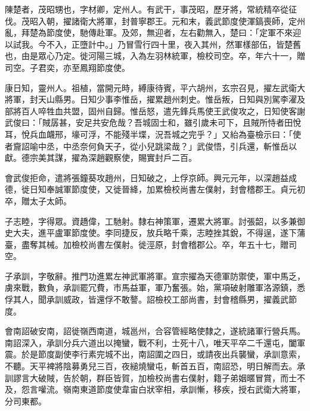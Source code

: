 \begin{pinyinscope}
 陳楚者，茂昭甥也，字材卿，定州人。有武干，事茂昭，歷牙將，常統精卒從征伐。茂昭入朝，擢諸衛大將軍，封普寧郡王。元和末，義武節度使渾鎬喪師，定州亂，拜楚為節度使，馳傳赴軍。及郊，無迎者，左右勸無入，楚曰：「定軍不來迎以試我。今不入，正墮計中。」乃冒雪行四十里，夜入其州，然軍樣部伍，皆楚舊也，由是眾心乃定。徙河陽三城，入為左羽林統軍，檢校司空。卒，年六十一，贈司空。子君奕，亦至鳳翔節度使。



 康日知，靈州人。祖植，當開元時，縛康待賓，平六胡州，玄宗召見，擢左武衛大將軍，封天山縣男。日知少事李惟岳，擢累趙州刺史。惟岳叛，日知與別駕李濯及部將百人啐牲血共盟，固州自歸。惟岳怒，遣先鋒兵馬使王武俊攻之，日知使客謝武俊曰：「賊孱甚，安足共安危哉？吾城固士和，雖引歲未可下，且賊所恃者田悅耳，悅兵血衊邢，壕可浮，不能殘半堞，況吾城之完乎？」又紿為臺檢示曰：「使者齎詔喻中丞，中丞奈何負天子，從小兒跳梁哉？」武俊悟，引兵還，斬惟岳以獻。德宗美其謀，擢為深趙觀察使，賜實封戶二百。



 會武俊拒命，遣將張鐘葵攻趙州，日知破之，上俘京師。興元元年，以深趙益成德，徙日知奉誠軍節度使，又徙晉絳，加累檢校尚書左僕射，封會稽郡王。貞元初卒，贈太子太師。



 子志睦，字得眾。資趫偉，工馳射。隸右神策軍，遷累大將軍。討張韶，以多兼御史大夫，進平盧軍節度使。李同捷反，放兵略千乘，志睦挫其銳，不得逞，遂下蒲臺，盡奪其械。加檢校尚書左僕射。徙涇原，封會稽郡公。卒，年五十七，贈司空。



 子承訓，字敬辭。推門功進累左神武軍將軍。宣宗擢為天德軍防禦使，軍中馬乏，虜來戰，數負，承訓罷冗費，市馬益軍，軍乃奮張。始，黨項破射雕軍洛源鎮，悉俘其人，聞承訓威政，皆還俘不敢謷。詔檢校工部尚書，封會稽縣男，擢義武節度。



 會南詔破安南，詔徙嶺西南道，城邕州，合容管經略使隸之，遂統諸軍行營兵馬。南詔深入，承訓分兵六道出以掩蠻，戰不利，士死十八，唯天平卒二千還屯，闔軍震。於是節度副使李行素完城不出，南詔圍之四日，或請夜出兵襲蠻，承訓意索，不聽。天平裨將陰募勇兒三百，夜縋燒蠻屯，斬首五百，南詔恐，明日解而去。承訓謬言大破賊，告於朝，群臣皆賀，加檢校尚書右僕射，籍子弟姻暱冒賞，而士不及，怨言嚾流。嶺南東道節度使韋宙白狀宰相，承訓慚，移疾，授右武衛大將軍，分司東都。




\end{pinyinscope}
